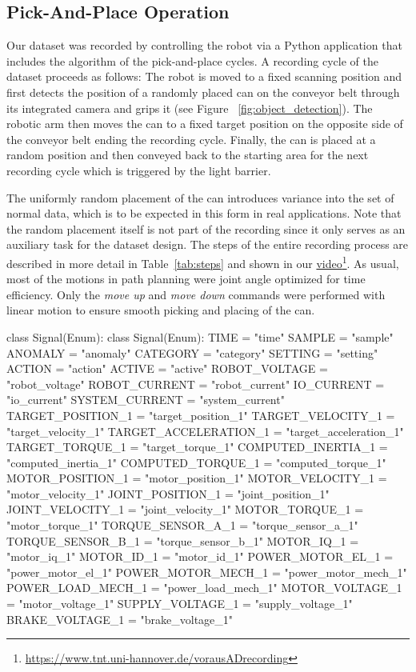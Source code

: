 \documentclass[journal]{IEEEtran}
\begin{document}
\subsection{Pick-And-Place Operation}
\label{pickplace}
Our dataset was recorded by controlling the robot via a Python application that includes the algorithm of the pick-and-place cycles.
A recording cycle of the dataset proceeds as follows: The robot is moved to a fixed scanning position and first detects the position of a randomly placed can on the conveyor belt through its integrated camera and grips it (see Figure ~\ref{fig:object_detection}).
The robotic arm then moves the can to a fixed target position on the opposite side of the conveyor belt ending the recording cycle.
Finally, the can is placed at a random position and then conveyed back to the starting area for the next recording cycle which is triggered by the light barrier.

The {uniformly} random placement of the can introduces variance into the set of normal data, which is to be expected in this form in real applications.
Note that the random placement itself is not part of the recording since it only serves as an auxiliary task for the dataset design.
The steps of the entire recording process are described in more detail in Table~\ref{tab:steps} {and shown in our \href{
https://www.tnt.uni-hannover.de/vorausADrecording}{video}}\footnote{\href{
https://www.tnt.uni-hannover.de/vorausADrecording}{
https://www.tnt.uni-hannover.de/vorausADrecording}}.
As usual, most of the motions in path planning were joint angle optimized for time efficiency.
Only the \textit{move up} and \textit{move down} commands were performed with linear motion to ensure smooth picking and placing of the can.

\iffalse
class Signal(Enum):
class Signal(Enum):
TIME = "time"
SAMPLE = "sample"
ANOMALY = "anomaly"
CATEGORY = "category"
SETTING = "setting"
ACTION = "action"
ACTIVE = "active"
ROBOT_VOLTAGE = "robot_voltage"
ROBOT_CURRENT = "robot_current"
IO_CURRENT = "io_current"
SYSTEM_CURRENT = "system_current"
TARGET_POSITION_1 = "target_position_1"
TARGET_VELOCITY_1 = "target_velocity_1"
TARGET_ACCELERATION_1 = "target_acceleration_1"
TARGET_TORQUE_1 = "target_torque_1"
COMPUTED_INERTIA_1 = "computed_inertia_1"
COMPUTED_TORQUE_1 = "computed_torque_1"
MOTOR_POSITION_1 = "motor_position_1"
MOTOR_VELOCITY_1 = "motor_velocity_1"
JOINT_POSITION_1 = "joint_position_1"
JOINT_VELOCITY_1 = "joint_velocity_1"
MOTOR_TORQUE_1 = "motor_torque_1"
TORQUE_SENSOR_A_1 = "torque_sensor_a_1"
TORQUE_SENSOR_B_1 = "torque_sensor_b_1"
MOTOR_IQ_1 = "motor_iq_1"
MOTOR_ID_1 = "motor_id_1"
POWER_MOTOR_EL_1 = "power_motor_el_1"
POWER_MOTOR_MECH_1 = "power_motor_mech_1"
POWER_LOAD_MECH_1 = "power_load_mech_1"
MOTOR_VOLTAGE_1 = "motor_voltage_1"
SUPPLY_VOLTAGE_1 = "supply_voltage_1"
BRAKE_VOLTAGE_1 = "brake_voltage_1"
\end{document}
